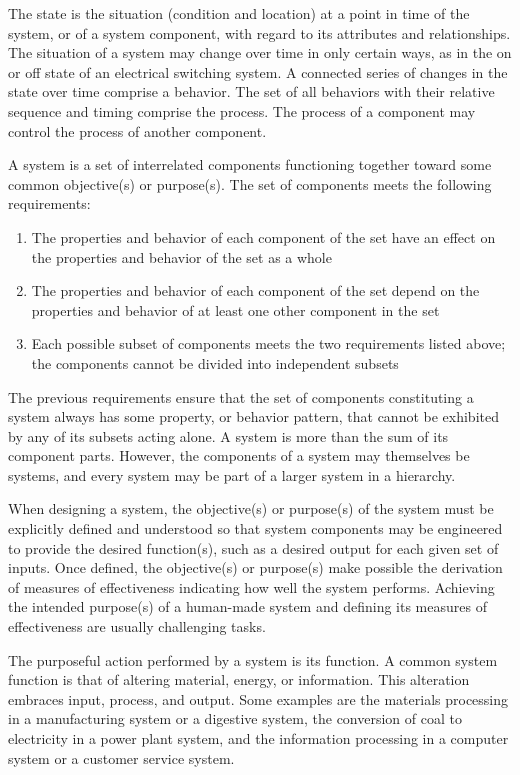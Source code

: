 The state is the situation (condition and location) at a point in time of the system, or of a system component, with regard to its attributes and relationships. The situation of a system may change over time in only certain ways, as in the on or off state of an electrical switching system. A connected series of changes in the state over time comprise a behavior. The set of all behaviors with their relative sequence and timing comprise the process. The process of a component may control the process of another component.

A system is a set of interrelated components functioning together toward some common objective(s) or purpose(s). The set of components meets the following requirements:
\begin{enumerate}
\item The properties and behavior of each component of the set have an effect on the properties and behavior of the set as a whole
\item The properties and behavior of each component of the set depend on the properties and behavior of at least one other component in the set
\item Each possible subset of components meets the two requirements listed above; the components cannot be divided into independent subsets
\end{enumerate}

The previous requirements ensure that the set of components constituting a system always has some property, or behavior pattern, that cannot be exhibited by any of its subsets acting alone. A system is more than the sum of its component parts. However, the components of a system may themselves be systems, and every system may be part of a larger system in a hierarchy.

When designing a system, the objective(s) or purpose(s) of the system must be explicitly defined and understood so that system components may be engineered to provide the desired function(s), such as a desired output for each given set of inputs. Once defined, the objective(s) or purpose(s) make possible the derivation of measures of effectiveness indicating how well the system performs. Achieving the intended purpose(s) of a human-made system and defining its measures of effectiveness are usually challenging tasks.

The purposeful action performed by a system is its function. A common system function is that of altering material, energy, or information. This alteration embraces input, process, and output. Some examples are the materials processing in a manufacturing system or a digestive system, the conversion of coal to electricity in a power plant system, and the information processing in a computer system or a customer service system.

